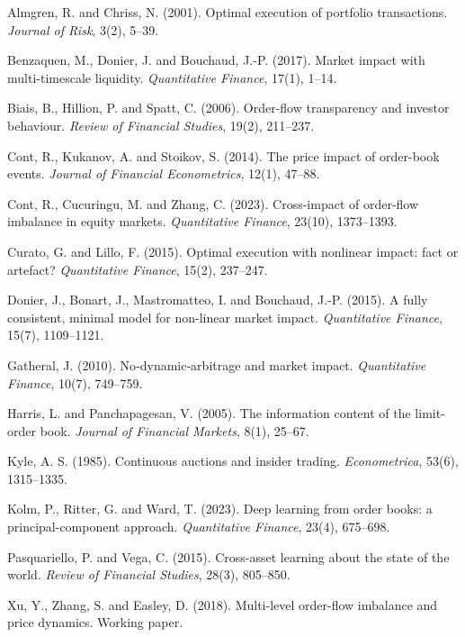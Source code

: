 \documentclass[11pt]{article}
\begin{document}
\vfill
\begin{thebibliography}{99}
Almgren, R. and Chriss, N. (2001). Optimal execution of portfolio transactions. \emph{Journal of Risk}, 3(2), 5--39.

Benzaquen, M., Donier, J. and Bouchaud, J.-P. (2017). Market impact with multi-timescale liquidity. \emph{Quantitative Finance}, 17(1), 1--14.

Biais, B., Hillion, P. and Spatt, C. (2006). Order-flow transparency and investor behaviour. \emph{Review of Financial Studies}, 19(2), 211--237.

Cont, R., Kukanov, A. and Stoikov, S. (2014). The price impact of order-book events. \emph{Journal of Financial Econometrics}, 12(1), 47--88.

Cont, R., Cucuringu, M. and Zhang, C. (2023). Cross-impact of order-flow imbalance in equity markets. \emph{Quantitative Finance}, 23(10), 1373--1393.

Curato, G. and Lillo, F. (2015). Optimal execution with nonlinear impact: fact or artefact? \emph{Quantitative Finance}, 15(2), 237--247.

Donier, J., Bonart, J., Mastromatteo, I. and Bouchaud, J.-P. (2015). A fully consistent, minimal model for non-linear market impact. \emph{Quantitative Finance}, 15(7), 1109--1121.

Gatheral, J. (2010). No‐dynamic‐arbitrage and market impact. \emph{Quantitative Finance}, 10(7), 749--759.

Harris, L. and Panchapagesan, V. (2005). The information content of the limit-order book. \emph{Journal of Financial Markets}, 8(1), 25--67.

Kyle, A. S. (1985). Continuous auctions and insider trading. \emph{Econometrica}, 53(6), 1315--1335.

Kolm, P., Ritter, G. and Ward, T. (2023). Deep learning from order books: a principal-component approach. \emph{Quantitative Finance}, 23(4), 675--698.

Pasquariello, P. and Vega, C. (2015). Cross-asset learning about the state of the world. \emph{Review of Financial Studies}, 28(3), 805--850.

Xu, Y., Zhang, S. and Easley, D. (2018). Multi-level order-flow imbalance and price dynamics. Working paper.

\end{thebibliography}
\end{document}
